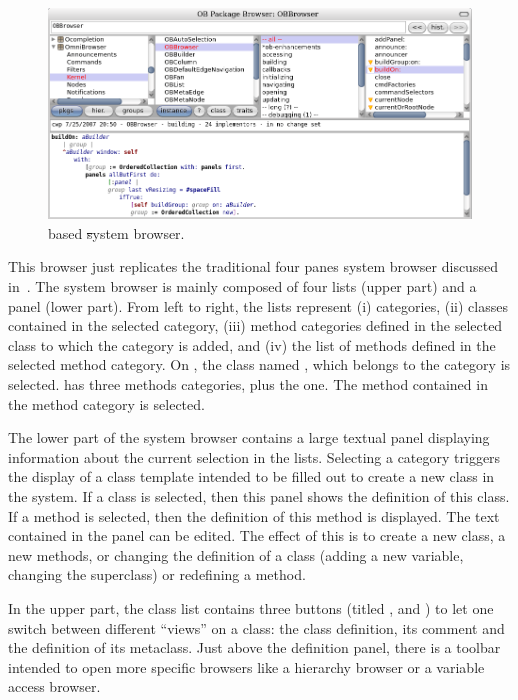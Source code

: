 \documentclass[a4paper,10pt,twoside]{book}
\begin{document}
\begin{figure}[!ht]
\begin{center}
\includegraphics[scale=0.30]{obbrowser.png}
\caption{\ob based \st system browser.} 
\end{center}
\end{figure}

This browser just replicates the traditional four panes system browser discussed in~.
The system browser is mainly composed of four lists (upper part) and a panel (lower part). From left to right, the lists represent (i) categories, (ii) classes contained in the selected category, (iii) method categories defined in the selected class to which the  category is added, and (iv) the list of methods defined in the selected method category. On , the class named , which belongs to the category  is selected.  has three methods categories, plus the  one. The method  contained in the  method category is selected.

The lower part of the system browser contains a large textual panel displaying information about the current selection in the lists. Selecting a category triggers the display of a class template intended to be filled out to create a new class in the system. If a class is selected, then this panel shows the definition of this class. If a method is selected, then the definition of this method is displayed. The text contained in the panel can be edited. The effect of this is to create a new class, a new methods, or changing the definition of a class (\eg adding a new variable, changing the superclass) or redefining a method.

In the upper part, the class list contains three buttons (titled ,  and ) to let one switch between different ``views'' on a class: the class definition, its comment and the definition of its metaclass. Just above the definition panel, there is a toolbar intended to open more specific browsers like a hierarchy browser or a variable access browser.
\end{document}
